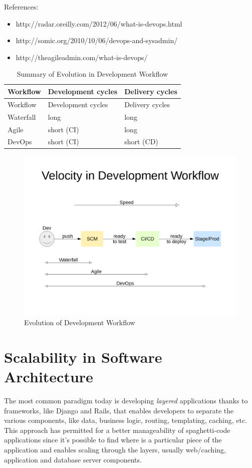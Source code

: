 References:
\begin{itemize}

\item
  http://radar.oreilly.com/2012/06/what-is-devops.html
\item
  http://somic.org/2010/10/06/devops-and-sysadmin/
\item
  http://theagileadmin.com/what-is-devops/
\end{itemize}

\begin{longtable}[c]{@{}lll@{}}
\caption{Summary of Evolution in Development Workflow}\tabularnewline
\toprule
Workflow & Development cycles & Delivery cycles\tabularnewline
\midrule
\endfirsthead
\toprule
Workflow & Development cycles & Delivery cycles\tabularnewline
\midrule
\endhead
Waterfall & long & long\tabularnewline
Agile & short (CI) & long\tabularnewline
DevOps & short (CI) & short (CD)\tabularnewline
\bottomrule
\end{longtable}

\begin{figure}[htbp]
\centering
\includegraphics{media/ch2-devops.png}
\caption{Evolution of Development Workflow}
\end{figure}

\section{Scalability in Software
Architecture}\label{scalability-in-software-architecture}

The most common paradigm today is developing \emph{layered} applications
thanks to frameworks, like Django and Rails, that enables developers to
separate the various components, like data, business logic, routing,
templating, caching, etc. This approach has permitted for a better
manageability of spaghetti-code applications since it's possible to find
where is a particular piece of the application and enables scaling
through the layers, usually web/caching, application and database server
components.

